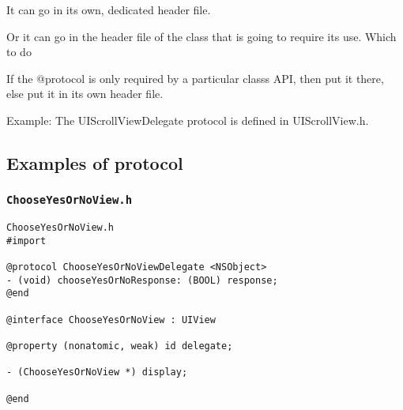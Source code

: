 \documentclass[12pt]{article}
\newcommand{\co}{\texttt}
\begin{document}
It can go in its own, dedicated header file.

Or it can go in the header file of the class that is going to require its use. Which to do

If the @protocol is only required by a particular classs API, then put it there,
else put it in its own header file.

Example: The UIScrollViewDelegate protocol is defined in UIScrollView.h.

\subsection{Examples of protocol}
\subsubsection{\co{ChooseYesOrNoView.h}}
\begin{lstlisting}
ChooseYesOrNoView.h
#import 

@protocol ChooseYesOrNoViewDelegate <NSObject>
- (void) chooseYesOrNoResponse: (BOOL) response;
@end

@interface ChooseYesOrNoView : UIView

@property (nonatomic, weak) id delegate;

- (ChooseYesOrNoView *) display;

@end

\end{lstlisting}
\end{document}
